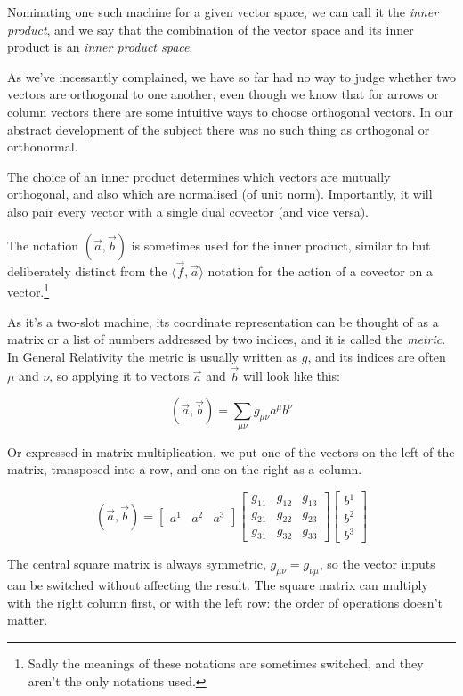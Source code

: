 Nominating one such machine for a given vector space, we can call it the \textit{inner product}, and we say that the combination of the vector space and its inner product is an \textit{inner product space}.

As we've incessantly complained, we have so far had no way to judge whether two vectors are orthogonal to one another, even though we know that for arrows or column vectors there are some intuitive ways to choose orthogonal vectors. In our abstract development of the subject there was no such thing as orthogonal or orthonormal.

The choice of an inner product determines which vectors are mutually orthogonal, and also which are normalised (of unit norm). Importantly, it will also pair every vector with a single dual covector (and vice versa).

The notation $(\vec{a},\vec{b})$ is sometimes used for the inner product, similar to but deliberately distinct from the $\langle \vec{f},\vec{a}\rangle$ notation for the action of a covector on a vector.\footnote{Sadly the meanings of these notations are sometimes switched, and they aren't the only notations used.}

As it's a two-slot machine, its coordinate representation can be thought of as a matrix or a list of numbers addressed by two indices, and it is called the \textit{metric}. In General Relativity the metric is usually written as $g$, and its indices are often $\mu$ and $\nu$, so applying it to vectors $\vec{a}$ and $\vec{b}$ will look like this:

$$
(\vec{a},\vec{b}) = \sum_{\mu\nu} g_{\mu\nu} a^\mu b^\nu
$$

Or expressed in matrix multiplication, we put one of the vectors on the left of the matrix, transposed into a row, and one on the right as a column.

$$
(\vec{a}, \vec{b}) =
\begin{bmatrix}
a^1 & a^2 & a^3
\end{bmatrix}
\begin{bmatrix}
g_{11} & g_{12} & g_{13} \\
g_{21} & g_{22} & g_{23} \\
g_{31} & g_{32} & g_{33}
\end{bmatrix}
\begin{bmatrix}
b^1 \\ b^2 \\ b^3
\end{bmatrix}
$$

The central square matrix is always symmetric, $g_{\mu\nu} = g_{\nu\mu}$, so the vector inputs can be switched without affecting the result. The square matrix can multiply with the right column first, or with the left row: the order of operations doesn't matter.

